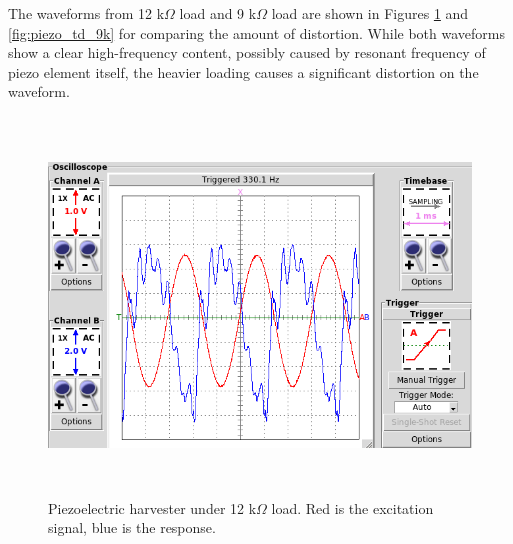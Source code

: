 \begin{table}[htb]
\caption{\label{tbl:piezo_harvester_shaker_output} Output power of piezo harvester at 18 k$\Omega$, 12 k$\Omega$ and 9 k$\Omega$ loads.}
\begin{center}
\end{center}
\end{table}

The waveforms from 12 k$\Omega$ load and 9 k$\Omega$ load are shown in Figures \ref{fig:piezo_td_12k} and \ref{fig:piezo_td_9k} for comparing the amount of distortion. While both waveforms show a clear high-frequency content, possibly caused by resonant frequency of piezo element itself, the heavier loading causes a significant distortion on the waveform.

\begin{figure}[htb]
\begin{center}
\includegraphics[height=10cm]{images/own_measurement/generator_shaker/piezo_td_12k_330hz_2_2.png}
\end{center}
\caption{\label{fig:piezo_td_12k} Piezoelectric harvester under 12 k$\Omega$ load. Red is the excitation signal, blue is the response.}
\end{figure}

